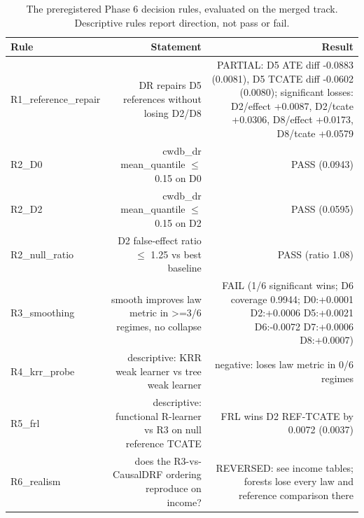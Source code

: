 \begin{table}[htbp]
\centering
\caption{The preregistered Phase 6 decision rules, evaluated on the merged track. Descriptive rules report direction, not pass or fail.}
\label{tab:p6-gates}
\small
\begin{tabular}{@{}lrr@{}}
\toprule
Rule & Statement & Result \\ 
\midrule
R1\_reference\_repair & DR repairs D5 references without losing D2/D8 & PARTIAL: D5 ATE diff -0.0883 (0.0081), D5 TCATE diff -0.0602 (0.0080); significant losses: D2/effect +0.0087, D2/tcate +0.0306, D8/effect +0.0173, D8/tcate +0.0579 \\ 
R2\_D0 & cwdb\_dr mean\_quantile $\leq$ 0.15 on D0 & PASS (0.0943) \\ 
R2\_D2 & cwdb\_dr mean\_quantile $\leq$ 0.15 on D2 & PASS (0.0595) \\ 
R2\_null\_ratio & D2 false-effect ratio $\leq$ 1.25 vs best baseline & PASS (ratio 1.08) \\ 
R3\_smoothing & smooth improves law metric in >=3/6 regimes, no collapse & FAIL (1/6 significant wins; D6 coverage 0.9944; D0:+0.0001 D2:+0.0006 D5:+0.0021 D6:-0.0072 D7:+0.0006 D8:+0.0007) \\ 
R4\_krr\_probe & descriptive: KRR weak learner vs tree weak learner & negative: loses law metric in 0/6 regimes \\ 
R5\_frl & descriptive: functional R-learner vs R3 on null reference TCATE & FRL wins D2 REF-TCATE by 0.0072 (0.0037) \\ 
R6\_realism & does the R3-vs-CausalDRF ordering reproduce on income? & REVERSED: see income tables; forests lose every law and reference comparison there \\ 
\bottomrule
\end{tabular}
\end{table}

